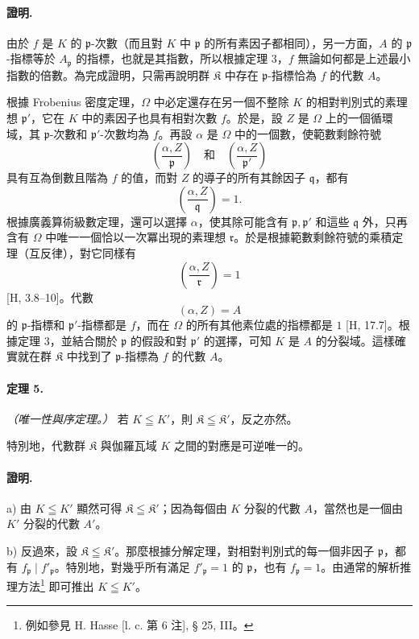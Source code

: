 \documentclass[11pt]{article}
\begin{document}
\paragraph{證明.}
由於 \(f\) 是 \(K\) 的 \(\mathfrak p\)-次數（而且對 \(K\) 中 \(\mathfrak p\) 的所有素因子都相同），另一方面，\(A\) 的 \(\mathfrak p\)-指標等於 \(A_{\mathfrak p}\) 的指標，也就是其指數，所以根據定理 3，\(f\) 無論如何都是上述最小指數的倍數。為完成證明，只需再說明群 \(\mathfrak K\) 中存在 \(\mathfrak p\)-指標恰為 \(f\) 的代數 \(A\)。

根據 Frobenius 密度定理，\(\Omega\) 中必定還存在另一個不整除 \(K\) 的相對判別式的素理想 \(\mathfrak p'\)，它在 \(K\) 中的素因子也具有相對次數 \(f\)。於是，設 \(Z\) 是 \(\Omega\) 上的一個循環域，其 \(\mathfrak p\)-次數和 \(\mathfrak p'\)-次數均為 \(f\)。再設 \(\alpha\) 是 \(\Omega\) 中的一個數，使範數剩餘符號
\[
\left(\frac{\alpha,Z}{\mathfrak p}\right)\quad\text{和}\quad
\left(\frac{\alpha,Z}{\mathfrak p'}\right)
\]
具有互為倒數且階為 \(f\) 的值，而對 \(Z\) 的導子的所有其餘因子 \(\mathfrak q\)，都有
\[
\left(\frac{\alpha,Z}{\mathfrak q}\right)=1.
\]
根據廣義算術級數定理，還可以選擇 \(\alpha\)，使其除可能含有 \(\mathfrak p,\mathfrak p'\) 和這些 \(\mathfrak q\) 外，只再含有 \(\Omega\) 中唯一一個恰以一次冪出現的素理想 \(\mathfrak r\)。於是根據範數剩餘符號的乘積定理（互反律），對它同樣有
\[
\left(\frac{\alpha,Z}{\mathfrak r}\right)=1
\]
[H, 3.8--10]。代數
\[
        (\alpha,Z)=A
\]
的 \(\mathfrak p\)-指標和 \(\mathfrak p'\)-指標都是 \(f\)，而在 \(\Omega\) 的所有其他素位處的指標都是 \(1\) [H, 17.7]。根據定理 3，並結合關於 \(\mathfrak p\) 的假設和對 \(\mathfrak p'\) 的選擇，可知 \(K\) 是 \(A\) 的分裂域。這樣確實就在群 \(\mathfrak K\) 中找到了 \(\mathfrak p\)-指標為 \(f\) 的代數 \(A\)。

\paragraph{定理 5.}
\emph{（唯一性與序定理。）} 若 \(K\leqq K'\)，則 \(\mathfrak K\leqq\mathfrak K'\)，反之亦然。

特別地，代數群 \(\mathfrak K\) 與伽羅瓦域 \(K\) 之間的對應是可逆唯一的。

\paragraph{證明.}
a) 由 \(K\leqq K'\) 顯然可得 \(\mathfrak K\leqq\mathfrak K'\)；因為每個由 \(K\) 分裂的代數 \(A\)，當然也是一個由 \(K'\) 分裂的代數 \(A'\)。

b) 反過來，設 \(\mathfrak K\leqq\mathfrak K'\)。那麼根據分解定理，對相對判別式的每一個非因子 \(\mathfrak p\)，都有 \(f_{\mathfrak p}\mid f'_{\mathfrak p}\)。特別地，對幾乎所有滿足 \(f'_{\mathfrak p}=1\) 的 \(\mathfrak p\)，也有 \(f_{\mathfrak p}=1\)。由通常的解析推理方法\footnote{例如參見 H. Hasse [l. c. 第 6 注], § 25, III。} 即可推出 \(K\leqq K'\)。
\end{document}
